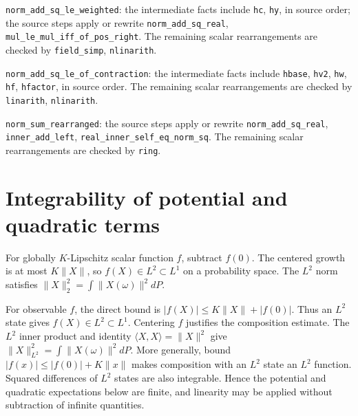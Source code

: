 \documentclass[11pt,a4paper]{article}
\begin{document}
\begin{leanbox}
\texttt{norm\_\allowbreak{}add\_\allowbreak{}sq\_\allowbreak{}le\_\allowbreak{}weighted}: the intermediate facts include \texttt{hc}, \texttt{hy}, in source order; the source steps apply or rewrite \texttt{norm\_\allowbreak{}add\_\allowbreak{}sq\_\allowbreak{}real}, \texttt{mul\_\allowbreak{}le\_\allowbreak{}mul\_\allowbreak{}iff\_\allowbreak{}of\_\allowbreak{}pos\_\allowbreak{}right}. The remaining scalar rearrangements are checked by \texttt{field\_\allowbreak{}simp}, \texttt{nlinarith}.



\texttt{norm\_\allowbreak{}add\_\allowbreak{}sq\_\allowbreak{}le\_\allowbreak{}of\_\allowbreak{}contraction}: the intermediate facts include \texttt{hbase}, \texttt{hv2}, \texttt{hw}, \texttt{hf}, \texttt{hfactor}, in source order. The remaining scalar rearrangements are checked by \texttt{linarith}, \texttt{nlinarith}.



\texttt{norm\_\allowbreak{}sum\_\allowbreak{}rearranged}: the source steps apply or rewrite \texttt{norm\_\allowbreak{}add\_\allowbreak{}sq\_\allowbreak{}real}, \texttt{inner\_\allowbreak{}add\_\allowbreak{}left}, \texttt{real\_\allowbreak{}inner\_\allowbreak{}self\_\allowbreak{}eq\_\allowbreak{}norm\_\allowbreak{}sq}. The remaining scalar rearrangements are checked by \texttt{ring}.
\end{leanbox}

\section{\texorpdfstring{Integrability of potential and quadratic terms}{Integrability of potential and quadratic terms}}


For globally \(K\)-Lipschitz scalar function \(f\), subtract \(f(0)\). The centered growth is at most \(K\|X\|\), so \(f(X)\in L^2\subset L^1\) on a probability space. The \(L^2\) norm satisfies \(\|X\|_2^2=\int\|X(\omega)\|^2dP\).



For observable \(f\), the direct bound is \(|f(X)|\le K\|X\|+|f(0)|\). Thus an \(L^2\) state gives \(f(X)\in L^2\subset L^1\). Centering \(f\) justifies the composition estimate. The \(L^2\) inner product and identity \(\langle X,X\rangle=\|X\|^2\) give \(\|X\|_{L^2}^2=\int\|X(\omega)\|^2dP\). More generally, bound \(|f(x)|\le|f(0)|+K\|x\|\) makes composition with an \(L^2\) state an \(L^2\) function. Squared differences of \(L^2\) states are also integrable. Hence the potential and quadratic expectations below are finite, and linearity may be applied without subtraction of infinite quantities.
\end{document}
